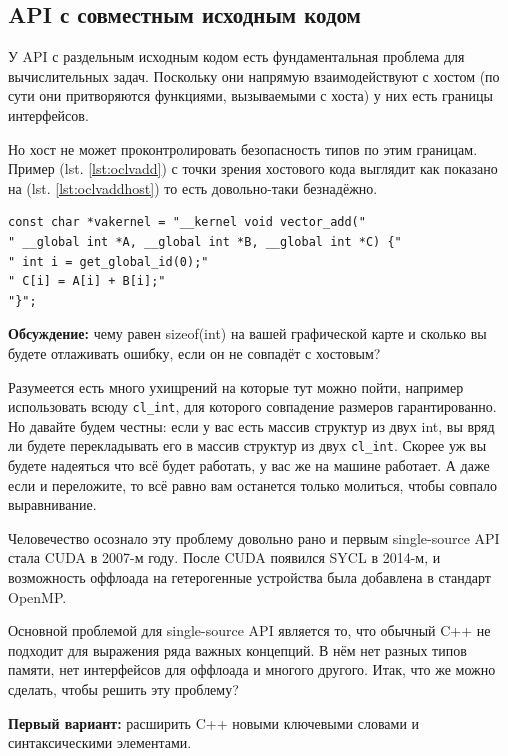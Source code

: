 \documentclass[a4paper,12pt,oneside]{article}
\begin{document}
\subsection{API с совместным исходным кодом}\label{subsec:typesafety}

У API с раздельным исходным кодом есть фундаментальная проблема для вычислительных задач.
Поскольку они напрямую взаимодействуют с хостом (по сути они притворяются функциями, вызываемыми с хоста) у них есть границы интерфейсов.

Но хост не может проконтролировать безопасность типов по этим границам. Пример (lst. \ref{lst:oclvadd}) с точки зрения хостового кода выглядит как показано на (lst. \ref{lst:oclvaddhost}) то есть довольно-таки безнадёжно.

\begin{lstlisting}[caption={Векторное сложение, OpenCL c точки зрения хоста},label={lst:oclvaddhost}]
const char *vakernel = "__kernel void vector_add("
" __global int *A, __global int *B, __global int *C) {"
" int i = get_global_id(0);"
" C[i] = A[i] + B[i];"
"}";
\end{lstlisting}

\textbf{Обсуждение:} чему равен sizeof(int) на вашей графической карте и сколько вы будете отлаживать ошибку, если он не совпадёт с хостовым?

Разумеется есть много ухищрений на которые тут можно пойти, например использовать всюду \lstinline!cl_int!, для которого совпадение размеров гарантированно.
Но давайте будем честны: если у вас есть массив структур из двух int, вы вряд ли будете перекладывать его в массив структур из двух \lstinline!cl_int!.
Скорее уж вы будете надеяться что всё будет работать, у вас же на машине работает.
А даже если и переложите, то всё равно вам останется только молиться, чтобы совпало выравнивание.

Человечество осознало эту проблему довольно рано и первым single-source API стала CUDA в 2007-м году. После CUDA появился SYCL в 2014-м, и возможность оффлоада на гетерогенные устройства была добавлена в стандарт OpenMP.

Основной проблемой для single-source API является то, что обычный C++ не подходит для выражения ряда важных концепций. В нём нет разных типов памяти, нет интерфейсов для оффлоада и многого другого. Итак, что же можно сделать, чтобы решить эту проблему?

\textbf{Первый вариант:} расширить C++ новыми ключевыми словами и синтаксическими элементами. 
\end{document}
